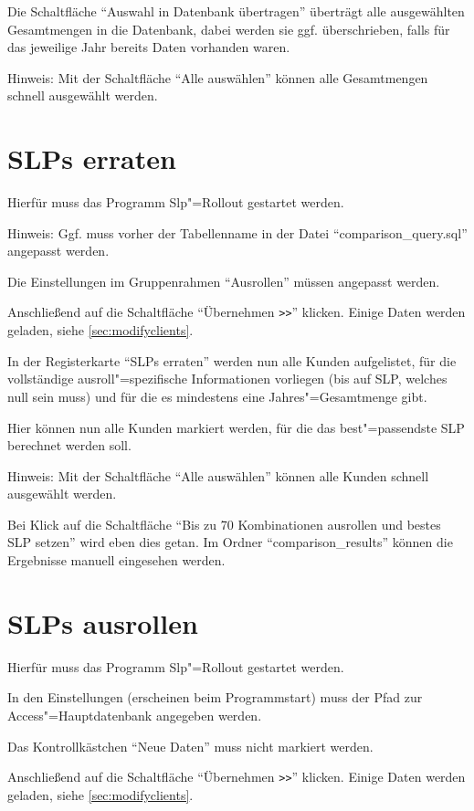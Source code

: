 Die Schaltfläche "`Auswahl in Datenbank übertragen"' überträgt alle ausgewählten Gesamtmengen in die Datenbank, dabei werden sie ggf. überschrieben, falls für das jeweilige Jahr bereits Daten vorhanden waren.

Hinweis: Mit der Schaltfläche "`Alle auswählen"' können alle Gesamtmengen schnell ausgewählt werden.

\section{SLPs erraten}

Hierfür muss das Programm Slp"=Rollout gestartet werden.

Hinweis: Ggf. muss vorher der Tabellenname in der Datei "`comparison\_query.sql"' angepasst werden.

Die Einstellungen im Gruppenrahmen "`Ausrollen"' müssen angepasst werden.

Anschließend auf die Schaltfläche "`Übernehmen \verb|>>|"' klicken. Einige Daten werden geladen, siehe \vref{sec:modifyclients}.


In der Registerkarte "`SLPs erraten"' werden nun alle Kunden aufgelistet, für die vollständige ausroll"=spezifische Informationen vorliegen (bis auf SLP, welches null sein muss) und für die es mindestens eine Jahres"=Gesamtmenge gibt.

Hier können nun alle Kunden markiert werden, für die das best"=passendste SLP berechnet werden soll.

Hinweis: Mit der Schaltfläche "`Alle auswählen"' können alle Kunden schnell ausgewählt werden.

Bei Klick auf die Schaltfläche "`Bis zu 70 Kombinationen ausrollen und bestes SLP setzen"' wird eben dies getan. Im Ordner "`comparison\_results"' können die Ergebnisse manuell eingesehen werden.

\section{SLPs ausrollen}

Hierfür muss das Programm Slp"=Rollout gestartet werden.

In den Einstellungen (erscheinen beim Programmstart) muss der Pfad zur Access"=Hauptdatenbank angegeben werden.

Das Kontrollkästchen "`Neue Daten"' muss nicht markiert werden.

Anschließend auf die Schaltfläche "`Übernehmen \verb|>>|"' klicken. Einige Daten werden geladen, siehe \vref{sec:modifyclients}.


